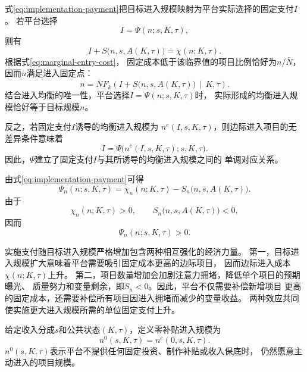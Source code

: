 \documentclass[UTF8, a4paper, 12pt, fontset=fandol]{ctexart}
\theoremstyle{definition}
\theoremstyle{remark}
\begin{document}
式\eqref{eq:implementation-payment}把目标进入规模映射为平台实际选择的固定支付$I$。
若平台选择
\begin{equation*}
  I=\Psi(n;s,K,\tau),
\end{equation*}
则有
\begin{equation*}
  I+S\bigl(n,s,A(K,\tau)\bigr)
  =
  \chi(n;K,\tau).
\end{equation*}
根据式\eqref{eq:marginal-entry-cost}，
固定成本低于该临界值的项目比例恰好为$n/\bar N$，因而$n$满足进入固定点：
\begin{equation*}
  n
  =
  \bar N
  F_k\left(
    I+S\bigl(n,s,A(K,\tau)\bigr)
    \,\middle|\,
    K,\tau
  \right).
\end{equation*}
结合进入均衡的唯一性，平台选择$I=\Psi(n;s,K,\tau)$时，
实际形成的均衡进入规模恰好等于目标规模$n$。

反之，若固定支付$I$诱导的均衡进入规模为
$n^e(I,s,K,\tau)$，则边际进入项目的无差异条件意味着
\begin{equation*}
  I
  =
  \Psi\bigl(n^e(I,s,K,\tau);s,K,\tau\bigr).
\end{equation*}
因此，$\Psi$建立了固定支付$I$与其所诱导的均衡进入规模之间的
单调对应关系。

由式\eqref{eq:implementation-payment}可得
\begin{equation}
  \Psi_n(n;s,K,\tau)
  =
  \chi_n(n;K,\tau)
  -
  S_n\bigl(n,s,A(K,\tau)\bigr).
  \label{eq:implementation-payment-derivative}
\end{equation}
由于
\begin{equation*}
  \chi_n(n;K,\tau)>0,
  \qquad
  S_n\bigl(n,s,A(K,\tau)\bigr)<0,
\end{equation*}
因而
\begin{equation}
  \Psi_n(n;s,K,\tau)>0.
  \label{eq:implementation-payment-increasing}
\end{equation}

实施支付随目标进入规模严格增加包含两种相互强化的经济力量。
第一，目标进入规模扩大意味着平台需要吸引固定成本更高的边际项目，
因而边际进入成本$\chi(n;K,\tau)$上升。
第二，项目数量增加会加剧注意力拥堵，降低单个项目的预期曝光、
质量努力和变量剩余，即$S_n<0$。因此，平台不仅需要补偿新增项目
更高的固定成本，还需要补偿所有项目因进入拥堵而减少的变量收益。
两种效应共同使实施更大进入规模所需的单位固定支付上升。

给定收入分成$s$和公共状态$(K,\tau)$，定义零补贴进入规模为
\begin{equation}
  n^0(s,K,\tau)
  =
  n^e(0,s,K,\tau).
  \label{eq:zero-subsidy-entry}
\end{equation}
$n^0(s,K,\tau)$表示平台不提供任何固定投资、制作补贴或收入保底时，
仍然愿意主动进入的项目规模。
\end{document}
